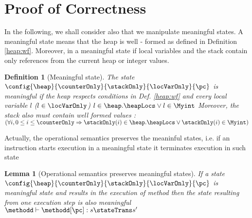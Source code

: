 
\newtheorem{proofDef}{Definition}[section] 
\newtheorem{lemma}{Lemma}[section] %
\newtheorem*{vcGenCorrect1}{Theorem  \ref{vcGenCorrect}}
\newcommand{\state}[1]{ \tau_{#1} } 
\newcommand{\straightBraces}[1]{ \texttt{ (} #1 \texttt{ )} }
\newcommand{\tbc}{\textit{TBC}}


\section{Proof of Correctness } \label{proof}

In the following, we shall consider also that we manipulate meaningful states. A meaningful state means that the heap is 
well - formed as defined in Definition \ref{heap:wf}. Moreover, in a meaningful state if local variables and the stack  contain only 
 references from the current heap or integer values.
\begin{proofDef}[Meaningful state]\label{meaningful}
The state $\config{\heap}{\counterOnly}{\stackOnly}{\locVarOnly}{\pc}  $ is meaningful if the heap respects conditions in Def. \ref{heap:wf}
and every local variable   $ l $ ($l \in \locVarOnly $)  $ l \in \heap.\heapLocs \vee l \in \Myint  $ 
Moreover, the stack also must contain well formed values : 
$ (\forall i, 0 \le i \le \counterOnly \Rightarrow \stackOnly(i) \in \heap.\heapLocs \vee \stackOnly(i)\in \Myint   )$
\end{proofDef}

Actually, the operational semantics preserves the meaninful states, i.e. if an instruction starts execution in a meaningful state 
it terminates execution in such state

\begin{lemma}[Operational semantics preserves meaningful states]\label{proof:opPresMeaningful}
If a state $\config{ \heap}{\counterOnly}{\stackOnly}{\locVarOnly}{ \pc}$ is meaningful state and results in the execution of method \methodd{}
 then the state resulting from one execution step is also meaningful $\methodd \vdash \methodd[\pc] : s \stateTrans s' $ 
\end{lemma}

 



